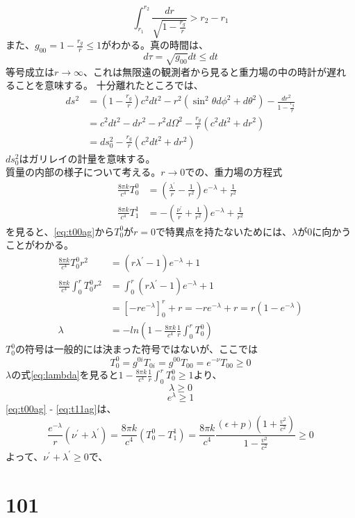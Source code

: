\documentclass{jsarticle}
\newcommand{\beq}{\begin{equation}}
\newcommand{\eeq}{\end{equation}}
\newcommand{\epikcf}{\frac{8 \pi k}{c^4}}
\newcommand{\revrt}{\frac{1}{r^2}}
\begin{document}
\beq
\int^{r_2}_{r_1} \frac{dr}{\sqrt{1 - \frac{r_g}{r}}} > r_2 - r_1\label{eq:10017}
\eeq
また、$g_{00} = 1 - \frac{r_g}{r} \leq 1$がわかる。真の時間は、
\beq
d\tau = \sqrt{g_{00}} dt \leq dt
\eeq
等号成立は$r \rightarrow \infty$、これは無限遠の観測者から見ると重力場の中の時計が遅れることを意味する。
十分離れたところでは、
\begin{align}
    ds^2 &= (1 - \frac{r_g}{r})c^2dt^2 - r^2(\sin^2 \theta d\phi^2 +d\theta^2) - \frac{dr^2}{1-\frac{r_g}{r}}\\
&= c^2 dt^2 - dr^2 - r^2 d\Omega^2 - \frac{r_g}{r} (c^2 dt^2 + dr^2)\\
&= ds_0^2 - \frac{r_g}{r} (c^2 dt^2 + dr^2)
\end{align}
$ds_0^2$はガリレイの計量を意味する。\\
質量の内部の様子について考える。$r \rightarrow 0$での、重力場の方程式
\begin{align}
\epikcf T^0_0 &= (\frac{\lambda^\prime}{r} - \frac{1}{r^2})e^{-\lambda} + \frac{1}{r^2} \label{eq:t00ag}\\ 
    \epikcf T^1_1 &= - (\frac{\nu^\prime}{r} + \frac{1}{r^2})e^{-\lambda} + \revrt \label{eq:t11ag}
\end{align}
を見ると、\eqref{eq:t00ag}から$T^0_0$が$r=0$で特異点を持たないためには、$\lambda$が0に向かうことがわかる。
\begin{align}
\epikcf T^0_0 r^2 &= (r \lambda^\prime - 1)e^{-\lambda} + 1\\ 
\epikcf \int^r_0  T^0_0 r^2 &= \int^r_0 (r \lambda^\prime - 1)e^{-\lambda} + 1\\ 
                            &= [-re^{-\lambda}]^r_0 + r = -r e^{-\lambda} + r = r(1 - e^{-\lambda})\\ 
\lambda &= - ln\left(1 - \epikcf \frac{1}{r} \int^r_0  T^0_0 \right)\label{eq:lambda}
\end{align}
$T^0_0$の符号は一般的には決まった符号ではないが、ここでは
\beq
T^0_0 = g^{0i}T_{0i} = g^{00} T_{00} = e^{-\nu} T_{00} \geq 0
\eeq
$\lambda$の式\eqref{eq:lambda}を見ると$1 - \epikcf \frac{1}{r} \int^r_0  T^0_0 \geq 1$より、
\beq
\lambda \geq 0
\eeq
\beq
e^\lambda \geq 1
\eeq
\eqref{eq:t00ag} - \eqref{eq:t11ag}は、
\beq
\frac{e^{-\lambda}}{r}(\nu^\prime + \lambda^\prime) = 
\epikcf (T^0_0 - T^1_1) = \epikcf\frac{(\epsilon + p)(1 + \frac{v^2}{c^2})}{1-\frac{v^2}{c^2}} \geq 0
\eeq
よって、$\nu^\prime + \lambda^\prime \geq 0$で、
\section{101}
\end{document}
